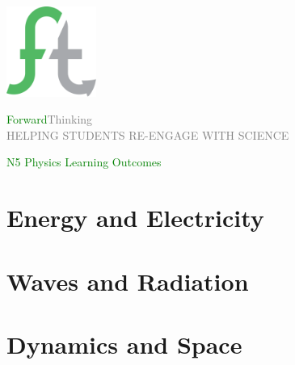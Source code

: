 \documentclass[12pt, a4paper, landscape, dvipsnames]{report}
\begin{document}

\begin{titlepage}
	\begin{center}
		\vspace*{3cm}
		\includegraphics[width=0.22\textwidth]{ftlogo} \\
		\vspace*{1cm}
        \begin{centering}
            {\fontsize{1.5cm}{1cm}\selectfont
            \textcolor{Green}{Forward}\textcolor{Gray}{Thinking}
            }\\
            \vspace*{0.5cm}
            {\fontsize{.5cm}{1cm}\selectfont
            \textcolor{Gray}{HELPING STUDENTS RE-ENGAGE WITH SCIENCE}
            }\\
        \end{centering}
		\vspace*{2cm}
        \begin{centering}
            {\fontsize{1.5cm}{1cm}\selectfont
            \textcolor{Green}{N5 Physics Learning Outcomes}
            }
        \end{centering}
	\end{center}
\end{titlepage}

\pagestyle{logo}

\chapter{Energy and Electricity}


\chapter{Waves and Radiation}


\chapter{Dynamics and Space}

\end{document}
